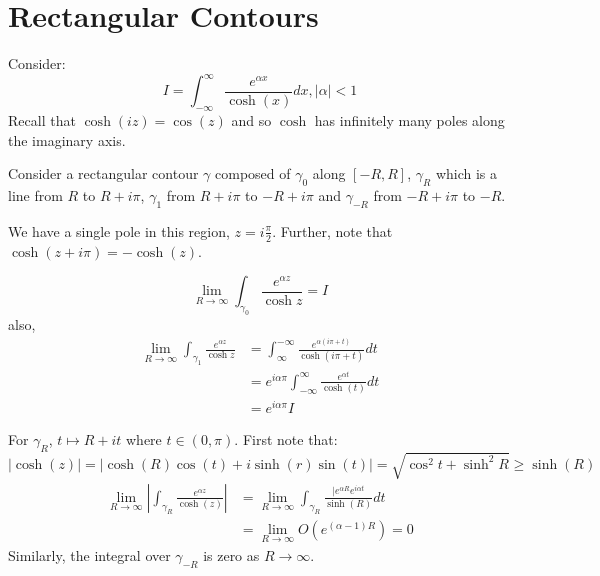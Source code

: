 \documentclass[../Main.tex]{subfiles}
\begin{document}
\section{Rectangular Contours}
\begin{example}
    Consider:
    \begin{equation*}
        I = \int_{-\infty}^{\infty} \frac{e^{\alpha x}}{\cosh(x)} dx, |\alpha| < 1
    \end{equation*}
    Recall that $\cosh(iz) = \cos(z)$ and so $\cosh$ has infinitely many poles along the imaginary axis.

    Consider a rectangular contour $\gamma$ composed of $\gamma_0$ along $[-R, R]$, $\gamma_R$ which is a line from $R$ to $R + i\pi$, $\gamma_1$ from $R + i \pi$ to $-R + i \pi$ and $\gamma_{-R}$ from $-R + i\pi$ to $-R$.

    We have a single pole in this region, $z = i \frac{\pi}{2}$. Further, note that $\cosh(z + i \pi) = -\cosh(z)$.

    \begin{equation*}
        \lim_{R\to\infty} \int_{\gamma_0} \frac{e^{\alpha z}}{\cosh z} = I
    \end{equation*}
    also,
    \begin{align*}
        \lim_{R\to\infty} \int_{\gamma_1} \frac{e^{\alpha z}}{\cosh z} &= \int_{\infty}^{-\infty} \frac{e^{\alpha (i \pi + t)}}{\cosh(i \pi + t)} dt \\
        &= e^{i \alpha \pi} \int_{-\infty}^{\infty} \frac{e^{\alpha t}}{\cosh(t)} dt \\
        &= e^{i \alpha \pi} I
    \end{align*}

    For $\gamma_R$, $t \mapsto R + i t$ where $t \in (0, \pi)$. First note that:
    \begin{equation*}
        |\cosh(z)| = |\cosh(R) \cos(t) + i \sinh(r) \sin(t)| = \sqrt{\cos^2t + \sinh^2R} \geq \sinh(R)
    \end{equation*}
    \begin{align*}
        \lim_{R \to \infty} \left|\int_{\gamma_R} \frac{e^{\alpha z}}{\cosh(z)}\right| &= \lim_{R \to \infty} \int_{\gamma_R} \frac{|e^{\alpha R} e^{i \alpha t}}{\sinh(R)} dt \\
        &= \lim_{R \to \infty} O(e^{(\alpha - 1)R}) = 0
    \end{align*}
    Similarly, the integral over $\gamma_{-R}$ is zero as $R \to \infty$.


\end{example}
\end{document}
